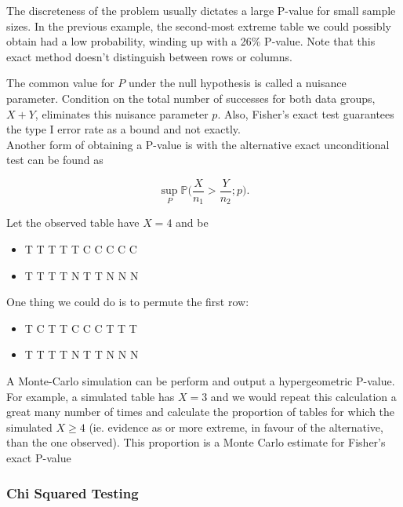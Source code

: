 \documentclass{homework}
\begin{document}
The discreteness of the problem usually dictates a large P-value for small sample sizes. In the previous example, the second-most extreme table we could possibly obtain had a low probability, winding up with a 26\% P-value. Note that this exact method doesn't distinguish between rows or columns. 

The common value for $P$ under the null hypothesis is called a nuisance parameter. Condition on the total number of successes for both data groups, $X+Y$, eliminates this nuisance parameter $p$. Also, Fisher's exact test guarantees the type I error rate as a bound and not exactly. \\

Another form of obtaining a P-value is with the alternative exact unconditional test can be found as 

$$
\sup_{P} \mathds{P}\bigg(\frac{X}{n_1} > \frac{Y}{n_2}; p\bigg).
$$

\begin{tcolorbox}[title=Fisher's exact test with Monte Carlo]

Let the observed table have $X=4$ and be 

\begin{itemize}
    \item T T T T T C C C C C \\
    \item T T T T N T T N N N 
\end{itemize}

One thing we could do is to permute the first row:

\begin{itemize}
    \item T C T T C C C T T T \\
    \item T T T T N T T N N N 
\end{itemize}

A Monte-Carlo simulation can be perform and output a hypergeometric P-value. 
For example, a simulated table has $X=3$ and we would repeat this calculation a great many number of times and calculate the proportion of tables for which the simulated $X \geq 4$ (ie. evidence as or more extreme, in favour of the alternative, than the one observed). This proportion is a Monte Carlo estimate for Fisher's exact P-value 

\end{tcolorbox}

\subsubsection{Chi Squared Testing}
\end{document}
